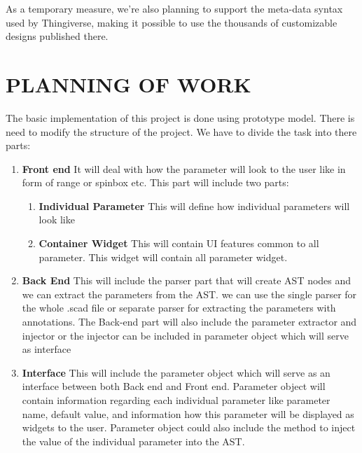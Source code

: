 \documentclass[12pt]{report}
\begin{document}
As a temporary measure, we're also planning to support the meta-data syntax used by Thingiverse, making it possible to use the thousands of customizable designs published there.




\chapter{PLANNING OF WORK}

The basic implementation of this project is done using prototype model. There is need to modify the structure of the project. We have to divide the task into there parts:

\begin{enumerate}
	\item \textbf{Front end}
	It will deal with how the parameter will look to the user like in form of range or spinbox etc. This part will include two parts:
	\begin{enumerate}
		\item \textbf{Individual Parameter}
		This will define how individual parameters will look like
		\item \textbf{Container Widget}
		This will contain UI features common to all parameter. This widget will contain all parameter widget.
		
	\end{enumerate}
	
	\item \textbf{Back End}
	This will include the parser part that will create AST nodes and we can extract the parameters from the AST. we can use the single parser for the whole .scad file or separate parser for extracting the parameters with annotations.
	The Back-end part will also include the parameter extractor and injector or the injector can be included in parameter object which will serve as interface
	\item \textbf{Interface}
	This will include the parameter object which will serve as an interface between both Back end and Front end. Parameter object will contain information regarding each individual parameter like parameter name, default value, and information how this parameter will be displayed as widgets to the user. Parameter object could also include the method to inject the value of the individual parameter into the AST.
	
\end{enumerate}
\end{document}

